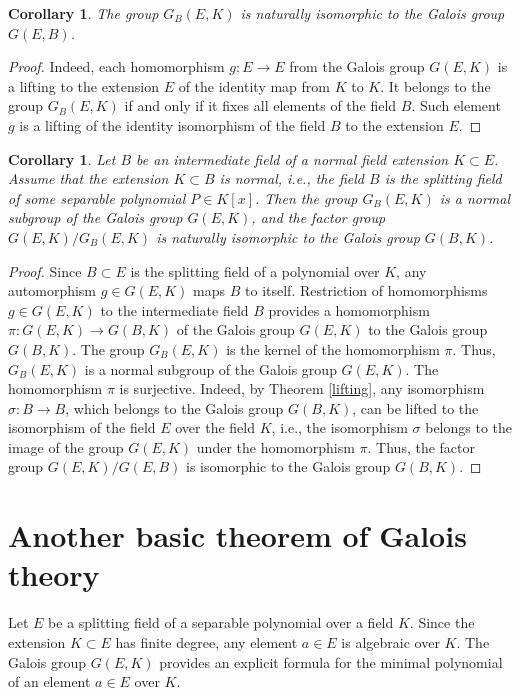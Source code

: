 \documentclass[11pt]{article}
\theoremstyle{plain}
\newtheorem{corollary}[theorem]{Corollary}
\theoremstyle{definition}
\begin{document}
 \begin{corollary}\label{subgroup}  The group $G_B(E,K)$ is naturally isomorphic to the Galois  group $G(E,B)$.
 \end{corollary}

\begin{proof} Indeed, each homomorphism $g:E\to E$ from the Galois group $G(E,K)$      is a lifting to the extension $E$ of the identity map from $K$ to $K$. It belongs to the group $G_B(E,K)$
if and only if it  fixes all elements of the  field $B$.  Such element $g$ is a lifting  of the identity isomorphism  of the field $B$ to the extension $E$.
 \end{proof}

\begin{corollary}\label{factorgroup} Let $B$ be an intermediate field of a normal field extension $K\subset E$. Assume that the extension $K\subset B$ is normal, i.e., the field $B$ is the splitting field of some separable polynomial $P\in K[x]$. Then the group  $G_B(E,K)$ is a normal subgroup of the Galois group $G(E,K)$, and the factor group $G(E,K)/G_B(E,K)$ is naturally isomorphic to the Galois group $G(B,K)$.
 \end{corollary}

\begin{proof} Since $B\subset E$ is the splitting  field of a polynomial over $K$, any automorphism  $g\in G(E,K)$ maps $B$ to itself. Restriction of homomorphisms $g\in G(E,K)$ to the intermediate field $B$ provides a homomorphism $\pi:G(E,K)\to G(B,K)$ of the Galois group $G(E,K)$ to the Galois group $G(B,K)$. The group $G_B(E,K)$ is the kernel of the homomorphism $\pi$. Thus, $G_B(E,K)$ is a normal subgroup of the Galois group $G(E,K)$. The homomorphism $\pi$ is surjective. Indeed, by Theorem \ref{lifting}, any
isomorphism $\sigma:B\to B$, which belongs to the Galois group $G(B,K)$, can be lifted to the isomorphism of the field $E$ over the field $K$, i.e., the isomorphism $\sigma$ belongs to the image of the group $G(E,K)$ under the homomorphism $\pi$. Thus, the factor group $G(E,K)/G(E,B)$ is isomorphic to the Galois group $G(B,K)$.
\end{proof}

\section{Another  basic theorem of Galois theory}

Let  $E$ be a splitting field  of a separable polynomial   over a field $K$. Since the extension $K\subset E$ has finite degree, any element $a\in E$ is algebraic over $K$. The Galois group $G(E,K)$ provides an explicit formula for the minimal polynomial of an element $a\in E$ over $K$.
\end{document}

